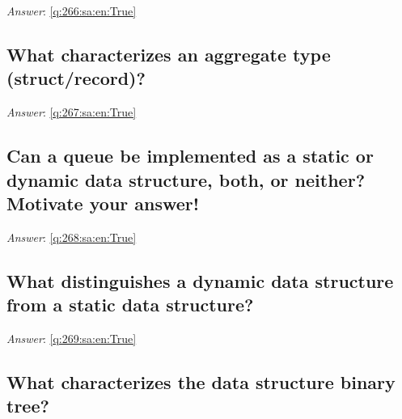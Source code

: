 \documentclass[a4paper,11pt,oneside]{article}
\begin{document}
\begin{sloppypar}
\noindent\makebox[\textwidth]{\hrulefill}

\vspace{1cm}

\textit{Answer}: \autoref{q:266:sa:en:True}



\subsection{What characterizes an aggregate type (struct/record)?}

\label{q:267:sa:en:False}

\vspace{2cm}

\noindent\makebox[\textwidth]{\hrulefill}

\vspace{1cm}

\textit{Answer}: \autoref{q:267:sa:en:True}



\subsection{Can a queue be implemented as a static or dynamic data structure, both, or neither? Motivate your answer!}

\label{q:268:sa:en:False}

\vspace{2cm}

\noindent\makebox[\textwidth]{\hrulefill}

\vspace{1cm}

\textit{Answer}: \autoref{q:268:sa:en:True}



\subsection{What distinguishes a dynamic data structure from a static data structure?}

\label{q:269:sa:en:False}

\vspace{2cm}

\noindent\makebox[\textwidth]{\hrulefill}

\vspace{1cm}

\textit{Answer}: \autoref{q:269:sa:en:True}



\subsection{What characterizes the data structure binary tree?}


\end{sloppypar}
\end{document}
